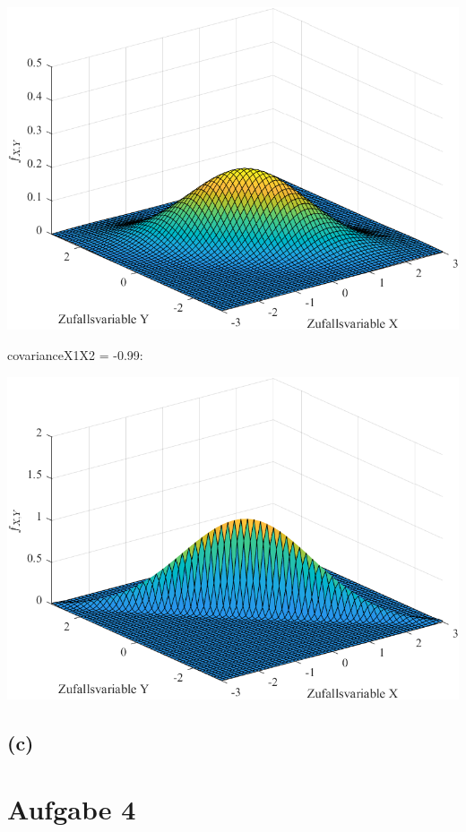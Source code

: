 \documentclass[a4paper]{scrartcl}
\begin{document}
\begin{center}
	\includegraphics*[scale = 0.5]{question3b3.png}
\end{center}
covarianceX1X2 = -0.99:
\begin{center}
	\includegraphics*[scale = 0.5]{question3b4.png}
\end{center}

\subsection*{(c)}






\section*{Aufgabe 4}
\end{document}
